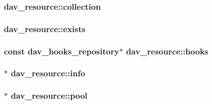 \subsubsection[{\texorpdfstring{collection}{collection}}]{ dav\+\_\+resource\+::collection}\hypertarget{structdav__resource_ac46ba5f33cdeec0bd1cccd8e548e3057}{}\label{structdav__resource_ac46ba5f33cdeec0bd1cccd8e548e3057}
\subsubsection[{\texorpdfstring{exists}{exists}}]{ dav\+\_\+resource\+::exists}\hypertarget{structdav__resource_acec863f4e61f4a5454c27bb41cf09324}{}\label{structdav__resource_acec863f4e61f4a5454c27bb41cf09324}
\subsubsection[{\texorpdfstring{hooks}{hooks}}]{\setlength{\rightskip}{0pt plus 5cm}const {\bf dav\+\_\+hooks\+\_\+repository}$\ast$ dav\+\_\+resource\+::hooks}\hypertarget{structdav__resource_a68b6668d61d787457251783e1caf4f12}{}\label{structdav__resource_a68b6668d61d787457251783e1caf4f12}
\subsubsection[{\texorpdfstring{info}{info}}]{$\ast$ dav\+\_\+resource\+::info}\hypertarget{structdav__resource_a27ebc9fd0931a822c97babe929e92ffb}{}\label{structdav__resource_a27ebc9fd0931a822c97babe929e92ffb}
\subsubsection[{\texorpdfstring{pool}{pool}}]{$\ast$ dav\+\_\+resource\+::pool}\hypertarget{structdav__resource_ab4d9a63baad83c01701bdefbf9375254}{}\label{structdav__resource_ab4d9a63baad83c01701bdefbf9375254}
